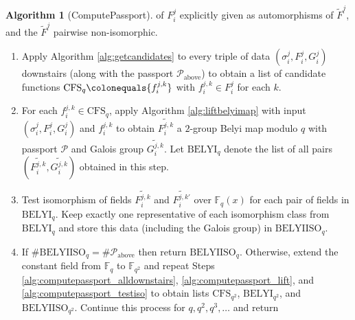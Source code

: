 \documentclass{dcthesis}
\newcommand{\wt}[1]{\widetilde{#1}}
\newcommand{\FF}{\mathbb{F}}
\numberwithin{equation}{section}
\theoremstyle{definition}
\newtheorem{alg}[equation]{Algorithm}
\theoremstyle{remark}
\begin{document}
{{{\begin{alg}[ComputePassport]
      of $F_i^j$
      explicitly given
      as automorphisms of $\wt{F}^j$,
      and the $\wt{F}^j$ pairwise
      non-isomorphic.
      \begin{enumerate}
        \item
          \label{alg:computepassport_alldownstairs}
          Apply Algorithm
          \ref{alg:getcandidates}
          to every triple of data
          $(\sigma_i^j,F_i^j,G_i^j)$
          downstairs
          (along with the passport
          $\mathcal{P}_\text{above}$)
          to obtain a list of candidate functions
          $\mathrm{CFS}_q
          \colonequals\{f_i^{j,k}\}$ with
          $f_i^{j,k}\in F_i^j$ for each $k$.
        \item
          \label{alg:computepassport_lift}
          For each $f_i^{j,k}\in\mathrm{CFS}_q$,
          apply Algorithm
          \ref{alg:liftbelyimap}
          with input
          $(\sigma_i^j,F_i^j,G_i^j)$
          and $f_i^{j,k}$
          to obtain
          $\wt{F_i^{j,k}}$ a $2$-group
          Belyi map modulo $q$ with
          passport $\mathcal{P}$ and
          Galois group
          $\wt{G_i^{j,k}}$.
          Let $\mathrm{BELYI}_q$
          denote the list of
          all pairs
          $(\wt{F_i^{j,k}}, \wt{G_i^{j,k}})$
          obtained in this step.
        \item
          \label{alg:computepassport_testiso}
          Test isomorphism of fields
          $\wt{F_i^{j,k}}$
          and $\wt{F_i^{j,k'}}$
          over $\FF_q(x)$
          for each pair of fields
          in $\mathrm{BELYI}_q$.
          Keep exactly one
          representative of each isomorphism
          class from $\mathrm{BELYI}_q$
          and store this data
          (including the Galois group)
          in $\mathrm{BELYIISO}_q$.
        \item
          If $\#\mathrm{BELYIISO}_q=
          \#\mathcal{P}_\text{above}$
          then return
          $\mathrm{BELYIISO}_q$.
          Otherwise,
          extend the constant field
          from $\FF_q$ to $\FF_{q^2}$
          and repeat Steps
          \ref{alg:computepassport_alldownstairs},
          \ref{alg:computepassport_lift},
          and
          \ref{alg:computepassport_testiso}
          to obtain lists
          $\mathrm{CFS}_{q^2}$,
          $\mathrm{BELYI}_{q^2}$,
          and
          $\mathrm{BELYIISO}_{q^2}$.
          Continue this process for
          $q,q^2,q^3,\dots$
          and return

\end{enumerate}
\end{alg}}}}
\end{document}
